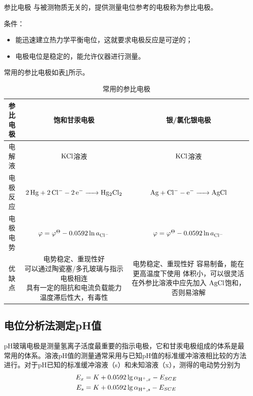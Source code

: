 \begin{definition*}{参比电极}{}
	与被测物质无关的，提供测量电位参考的电极称为参比电极。
\end{definition*}

条件：
\begin{itemize}
	\item 能迅速建立热力学平衡电位，这就要求电极反应是可逆的；
	\item 电极电位是稳定的，能允许仪器进行测量。
\end{itemize}

常用的参比电极如表\ref{tab:canbidianji}所示。

\begin{table}[!h]
	\centering
	\caption{常用的参比电极}
	\small
	\begin{tabular}{ccc}
		\toprule
		参比电极  & {饱和甘汞电极} & {银/氯化银电极} \\
		\midrule
		电解液   & $\ce{KCl}$溶液 & $\ce{KCl}$溶液 \\
		电极反应  & $\ce{2Hg + 2Cl- - 2e- -> Hg2Cl2}$ & $\ce{Ag + Cl- - e- -> AgCl}$ \\
		电极电势  & $\varphi=\varphi^{\Theta}- 0.0592\ln a_{\ce{Cl-}}$ & $\varphi=\varphi^{\Theta}-0.0592\ln a_{\ce{Cl-}}$ \\
		\midrule
		优缺点    & \tabincell{c}{电势稳定、重现性好\\ 可以通过陶瓷塞/多孔玻璃与指示电极相连\\具有一定的阻抗和电流负载能力\\温度滞后性大，有毒性} & \tabincell{c}{电势稳定、重现性好\\ 容易制备，能在更高温度下使用\\体积小，可以很灵活\\ 在外参比溶液中应先加入\\$\ce{AgCl}$饱和，否则易溶解} \\
		\bottomrule
	\end{tabular}%
	\normalsize
	\label{tab:canbidianji}%
\end{table}%

\subsection{电位分析法测定pH值}

pH玻璃电极是测量氢离子活度最重要的指示电极，它和甘汞电极组成的体系是最常用的体系。溶液pH值的测量通常采用与已知pH值的标准缓冲溶液相比较的方法进行。对于$\mathrm{pH}$已知的标准缓冲溶液（s）和未知溶液（x），测得的电动势分别为
\begin{gather*}
	E_x=K+0.0592\lg {\alpha_{\ce{H+},x}}-E_{SCE}\\
	E_s=K+0.0592\lg {\alpha_{\ce{H+},s}}-E_{SCE}
\end{gather*}

